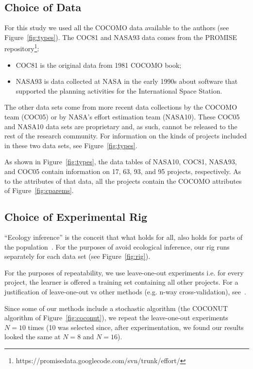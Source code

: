 \documentclass{sig-alternate}
\newcommand{\bi}{\begin{itemize}}
\newcommand{\ei}{\end{itemize}}
\newcommand{\fig}[1]{Figure~\ref{fig:#1}}
\begin{document}
\subsection{Choice of Data}\label{sect:data}
For this study we used all the COCOMO data available to the authors
(see \fig{types}).
The COC81 and NASA93 data comes
from the PROMISE repository\footnote{https://promisedata.googlecode.com/svn/trunk/effort/}:
\bi
\item COC81 is the original data from 1981 COCOMO book;
\item NASA93 is data collected at  NASA  in the early 1990s
 about software that supported  the planning activities for the International
Space Station.
\ei
The other data
sets come from more recent data collections by the COCOMO team (COC05) or by NASA's
effort estimation team (NASA10).  These COC05 and NASA10 data sets are proprietary and, as such,
cannot be released to the rest of the research community. For information on the kinds
of projects included in these two data sets, see \fig{types}.

As shown in \fig{types}, the data tables of NASA10, COC81, NASA93, and COC05
contain information on 17, 63, 93, and 95  projects, respectively.
As to the attributes of that data, all the projects contain the COCOMO attributes of 
\fig{cparems}.




\subsection{Choice of Experimental Rig}


``Ecology inference''
is the conceit 
that what holds for all, also holds for parts 
of the population~\cite{posnet11,me12d}.
For the purposes of avoid ecological inference,
our  rig runs separately for each data set (see Figure~\ref{fig:rig}).

For the purposes of repeatability, we use
leave-one-out experiments 
i.e. for every project, the learner is offered a training
set containing all other projects. For a justification of leave-one-out
vs other methods (e.g. n-way cross-validation), see~\cite{koc13a}.



Since some of our methods include a stochastic
algorithm (the COCONUT algorithm of \fig{coconut}),
we repeat the leave-one-out experiments $N=10$ times
(10 was selected since, after experimentation, we
found our results looked the same at $N=8$ and
$N=16$).
\end{document}
